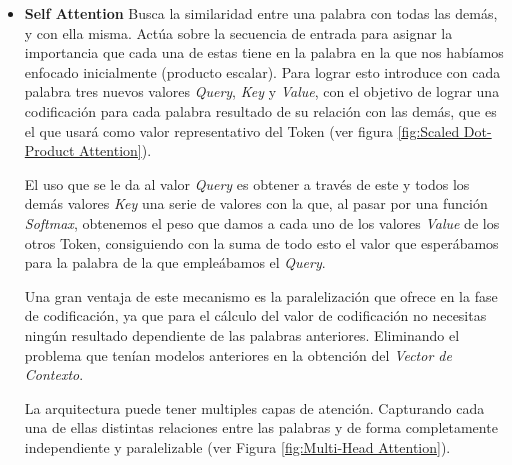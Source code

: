 \begin{itemize}
	\item\textbf{Self Attention} Busca la similaridad entre una palabra con todas las demás, y con ella misma. Actúa sobre la secuencia de entrada para asignar la importancia que cada una de estas tiene en la palabra en la que nos habíamos enfocado inicialmente (producto escalar). Para lograr esto introduce con cada palabra tres nuevos valores \textit{Query}, \textit{Key} y \textit{Value}, con el objetivo de lograr una codificación para cada palabra resultado de su relación con las demás, que es el que usará como valor representativo del Token (ver figura \ref{fig:Scaled Dot-Product Attention}).

El uso que se le da al valor \textit{Query} es obtener a través de este y todos los demás valores \textit{Key} una serie de valores con la que, al pasar por una función \textit{Softmax}, obtenemos el peso que damos a cada uno de los valores \textit{Value} de los otros Token, consiguiendo con la suma de todo esto el valor que esperábamos para la palabra de la que empleábamos el \textit{Query}.

Una gran ventaja de este mecanismo es la paralelización que ofrece en la fase de codificación, ya que para el cálculo del valor de codificación no necesitas ningún resultado dependiente de las palabras anteriores. Eliminando el problema que tenían modelos anteriores en la obtención del \textit{Vector de Contexto}.

La arquitectura puede tener multiples capas de atención. Capturando cada una de ellas distintas relaciones entre las palabras y de forma completamente independiente y paralelizable (ver Figura \ref{fig:Multi-Head Attention}).


\end{itemize}
